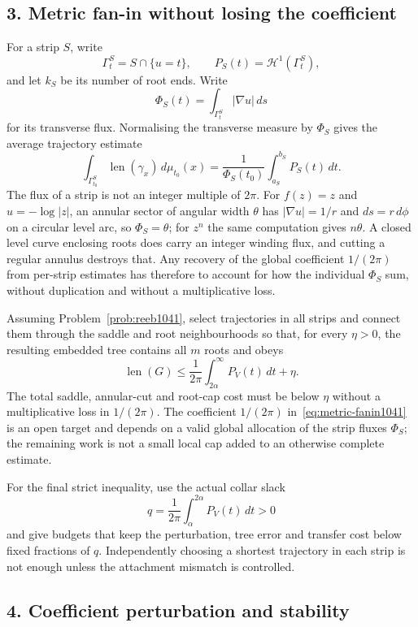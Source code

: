 \documentclass[11pt]{article}
\begin{document}
\subsection*{3. Metric fan-in without losing the coefficient}

For a strip $S$, write
\[
 \Gamma_t^S=S\cap\{u=t\},\qquad
 P_S(t)=\mathcal H^1(\Gamma_t^S),
\]
and let $k_S$ be its number of root ends.  Write
\[
 \Phi_S(t)=\int_{\Gamma_t^S}|\nabla u|\,ds
\]
for its transverse flux.  Normalising the transverse measure by $\Phi_S$ gives
the average trajectory estimate
\[
 \int_{\Gamma_{t_0}^S}\operatorname{len}(\gamma_x)\,d\mu_{t_0}(x)
 =
 \frac1{\Phi_S(t_0)}\int_{a_S}^{b_S}P_S(t)\,dt .
\]
The flux of a strip is not an integer multiple of $2\pi$.  For $f(z)=z$ and
$u=-\log|z|$, an annular sector of angular width $\theta$ has $|\nabla u|=1/r$
and $ds=r\,d\phi$ on a circular level arc, so $\Phi_S=\theta$; for $z^n$ the
same computation gives $n\theta$.  A closed level curve enclosing roots does
carry an integer winding flux, and cutting a regular annulus destroys that.
Any recovery of the global coefficient $1/(2\pi)$ from per-strip estimates has
therefore to account for how the individual $\Phi_S$ sum, without duplication
and without a multiplicative loss.

\begin{problem}\label{prob:metric1041}
Assuming Problem~\ref{prob:reeb1041}, select trajectories in all strips and
connect them through the saddle and root neighbourhoods so that, for every
$\eta>0$, the resulting embedded tree contains all $m$ roots and obeys
\[
 \operatorname{len}(G)
 \le\frac1{2\pi}\int_{2\alpha}^{\infty}P_V(t)\,dt+\eta.
\tag{6.1}\label{eq:metric-fanin1041}
\]
The total saddle, annular-cut and root-cap cost must be below $\eta$ without a
multiplicative loss in $1/(2\pi)$.  The coefficient $1/(2\pi)$
in~\eqref{eq:metric-fanin1041} is an open target and depends on a valid global
allocation of the strip fluxes $\Phi_S$; the remaining work is not a small
local cap added to an otherwise complete estimate.
\end{problem}

For the final strict inequality, use the actual collar slack
\[
 q=\frac1{2\pi}\int_{\alpha}^{2\alpha}P_V(t)\,dt>0
\]
and give budgets that keep the perturbation, tree error and transfer cost below
fixed fractions of $q$.  Independently choosing a shortest trajectory in each
strip is not enough unless the attachment mismatch is controlled.

\subsection*{4. Coefficient perturbation and stability}
\end{document}
